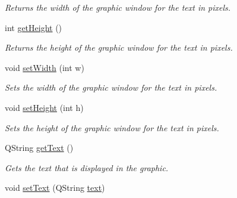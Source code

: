 \begin{DoxyCompactItemize}
\begin{DoxyCompactList}\small\item\em Returns the width of the graphic window for the text in pixels. \end{DoxyCompactList}\item 
\hypertarget{class_picto_1_1_text_graphic_a653268002412ea2ecf658bbdb0a3856a}{int \hyperlink{class_picto_1_1_text_graphic_a653268002412ea2ecf658bbdb0a3856a}{get\-Height} ()}\label{class_picto_1_1_text_graphic_a653268002412ea2ecf658bbdb0a3856a}

\begin{DoxyCompactList}\small\item\em Returns the height of the graphic window for the text in pixels. \end{DoxyCompactList}\item 
\hypertarget{class_picto_1_1_text_graphic_acd6a443442a2a76e4ea946d2ff3f1b86}{void \hyperlink{class_picto_1_1_text_graphic_acd6a443442a2a76e4ea946d2ff3f1b86}{set\-Width} (int w)}\label{class_picto_1_1_text_graphic_acd6a443442a2a76e4ea946d2ff3f1b86}

\begin{DoxyCompactList}\small\item\em Sets the width of the graphic window for the text in pixels. \end{DoxyCompactList}\item 
\hypertarget{class_picto_1_1_text_graphic_a50151b2d17ab46f52d7984f3949f2643}{void \hyperlink{class_picto_1_1_text_graphic_a50151b2d17ab46f52d7984f3949f2643}{set\-Height} (int h)}\label{class_picto_1_1_text_graphic_a50151b2d17ab46f52d7984f3949f2643}

\begin{DoxyCompactList}\small\item\em Sets the height of the graphic window for the text in pixels. \end{DoxyCompactList}\item 
\hypertarget{class_picto_1_1_text_graphic_a16fbe3e8d929e08c5f4502be77f65940}{Q\-String \hyperlink{class_picto_1_1_text_graphic_a16fbe3e8d929e08c5f4502be77f65940}{get\-Text} ()}\label{class_picto_1_1_text_graphic_a16fbe3e8d929e08c5f4502be77f65940}

\begin{DoxyCompactList}\small\item\em Gets the text that is displayed in the graphic. \end{DoxyCompactList}\item 
\hypertarget{class_picto_1_1_text_graphic_aff3b3c3af725130ccc48e6a828d47d39}{void \hyperlink{class_picto_1_1_text_graphic_aff3b3c3af725130ccc48e6a828d47d39}{set\-Text} (Q\-String \hyperlink{class_picto_1_1_text_graphic_adccc3ff15e9b3adf58ad589935786bd2}{text})}\label{class_picto_1_1_text_graphic_aff3b3c3af725130ccc48e6a828d47d39}


\end{DoxyCompactItemize}
